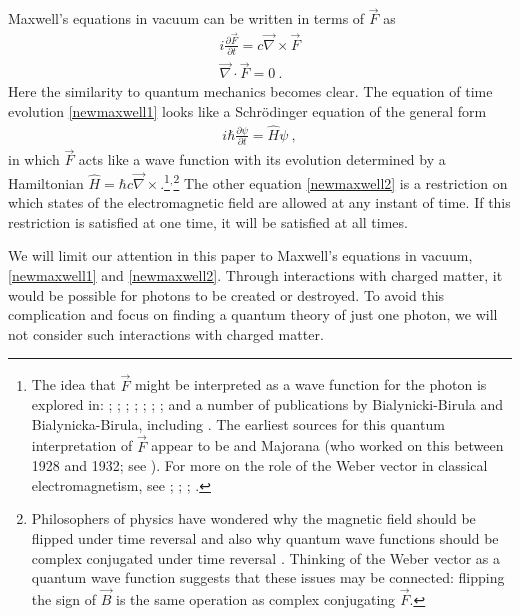 \documentclass[12pt,secnumarabic,amsmath,amssymb,balancelastpage,nofootinbib]{article}
\newcommand{\del}[0]{\ensuremath{\vec{\nabla}}}
\begin{document}
Maxwell's equations in vacuum can be written in terms of $\vec{F}$ as
\begin{align}
i\frac{\partial \vec{F}}{\partial t}  = c\del\times\vec{F}
\label{newmaxwell1}
\\
\del\cdot\vec{F}=0
\ .
\label{newmaxwell2}
\end{align}
Here the similarity to quantum mechanics becomes clear.  The equation of time evolution \eqref{newmaxwell1} looks like a Schr\"{o}dinger equation of the general form
\begin{align}
i \hbar \frac{\partial \psi}{\partial t} = \widehat{H} \psi
\ ,
\end{align}
in which $\vec{F}$ acts like a wave function with its evolution determined by a Hamiltonian $\widehat{H}=\hbar c \del\times$.\footnote{The idea that $\vec{F}$ might be interpreted as a wave function for the photon is explored in: \citet{rumer1930, archibald1955}; \citet{good1957, good1985}; \citet[ch.\ 11]{goodnelson1971}; \citet{moses1959}; \citet{kobe1999, esposito1999, holland2005, raymer2005, keller2005, cugnon2011, chandrasekar2012}; \citet[pg.\ 117]{norsen2017}; \citet{kiessling2017}; and a number of publications by Bialynicki-Birula and Bialynicka-Birula, including \citet{bb1994, bb1996, bb2013}.  The earliest sources for this quantum interpretation of $\vec{F}$ appear to be \citet{rumer1930} and Majorana (who worked on this between 1928 and 1932; see \citealp{mignani1974}).  For more on the role of the Weber vector in classical electromagnetism, see \citet{weber1901, silberstein1907a, silberstein1907b, hestenes1966}; \citet[sec.\ 25]{landaulifshitzfields}; \citet[sec.\ 16.II]{dresden1987}; \citet{riesz1993}.\label{allthesources}}$^,$\footnote{Philosophers of physics have wondered why the magnetic field should be flipped under time reversal and also why quantum wave functions should be complex conjugated under time reversal \citep{albert, callender2000}.  Thinking of the Weber vector as a quantum wave function suggests that these issues may be connected: flipping the sign of $\vec{B}$ is the same operation as complex conjugating $\vec{F}$.}  The other equation \eqref{newmaxwell2} is a restriction on which states of the electromagnetic field are allowed at any instant of time.  If this restriction is satisfied at one time, it will be satisfied at all times.


We will limit our attention in this paper to Maxwell's equations in vacuum, \eqref{newmaxwell1} and \eqref{newmaxwell2}.  Through interactions with charged matter, it would be possible for photons to be created or destroyed.  To avoid this complication and focus on finding a quantum theory of just one photon, we will not consider such interactions with charged matter.
\end{document}
